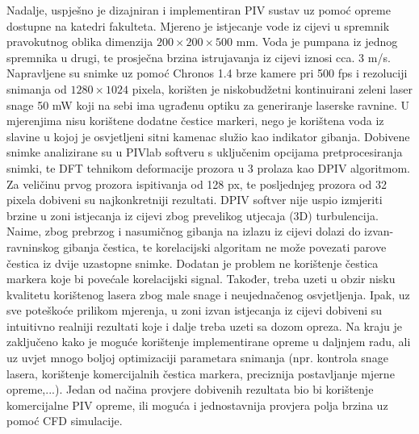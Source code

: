 Nadalje, uspješno je dizajniran i implementiran PIV sustav uz pomoć opreme dostupne na katedri fakulteta. Mjereno je istjecanje vode iz cijevi u spremnik pravokutnog oblika dimenzija $200\times200\times500$ mm. Voda je pumpana iz jednog spremnika u drugi, te prosječna brzina istrujavanja iz cijevi iznosi cca. 3 m/s. Napravljene su snimke uz pomoć Chronos 1.4 brze kamere pri 500 fps i rezoluciji snimanja od $1280\times1024$ pixela, korišten je niskobudžetni kontinuirani zeleni laser snage 50 mW koji na sebi ima ugrađenu optiku za generiranje laserske ravnine. U mjerenjima nisu korištene dodatne čestice markeri, nego je korištena voda iz slavine u kojoj je osvjetljeni sitni kamenac služio kao indikator gibanja. Dobivene snimke analizirane su u PIVlab softveru s uključenim opcijama pretprocesiranja snimki, te DFT tehnikom deformacije prozora u 3 prolaza kao DPIV algoritmom. Za veličinu prvog prozora ispitivanja od 128 px, te posljednjeg prozora od 32 pixela dobiveni su najkonkretniji rezultati. DPIV softver nije uspio izmjeriti brzine u zoni istjecanja iz cijevi zbog prevelikog utjecaja (3D) turbulencija. Naime, zbog prebrzog i nasumičnog gibanja na izlazu iz cijevi dolazi do  izvan-ravninskog gibanja čestica, te korelacijski algoritam ne može povezati parove čestica iz dvije uzastopne snimke. Dodatan je problem ne korištenje čestica markera koje bi  povećale korelacijski signal. Također, treba uzeti u obzir nisku kvalitetu korištenog lasera zbog male snage i neujednačenog osvjetljenja. Ipak, uz sve poteškoće prilikom mjerenja, u zoni izvan istjecanja iz cijevi dobiveni su intuitivno realniji rezultati koje i dalje treba uzeti sa dozom opreza. Na kraju je zaključeno kako je moguće korištenje implementirane opreme u daljnjem radu, ali uz uvjet mnogo boljoj optimizaciji parametara snimanja (npr. kontrola snage lasera, korištenje komercijalnih čestica markera, preciznija postavljanje mjerne opreme,...). Jedan od načina provjere dobivenih rezultata bio bi korištenje komercijalne PIV opreme, ili moguća i jednostavnija provjera polja brzina uz pomoć CFD simulacije.